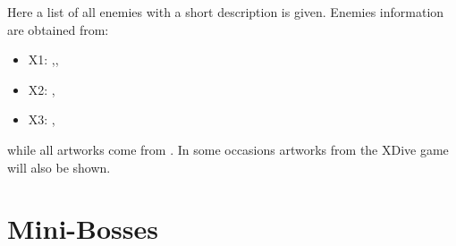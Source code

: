 Here a list of all enemies with a short description is given. Enemies information are obtained from: 
\begin{itemize}
	\item X1: \cite{wayback:X_resources},\cite{wiki:X1_enemies},
	\item X2: \cite{wayback:X2_resources},\cite{wiki:X2_enemies}
	\item X3: \cite{wayback:X3_resources},\cite{wiki:X3_enemies}
\end{itemize}
while all artworks come from \cite{book:MMX_Complete_art}. In some occasions artworks from the XDive game will also  be shown.

\section{Mini-Bosses}
